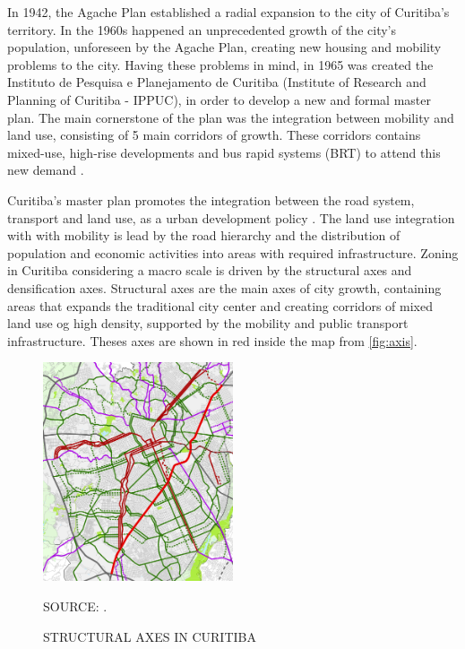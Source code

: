 In 1942, the Agache Plan established a radial expansion to the city of Curitiba's territory. In the 1960s happened an unprecedented growth of the city's population, unforeseen by the Agache Plan, creating new housing and mobility problems to the city. Having these problems in mind, in 1965 was created the Instituto de Pesquisa e Planejamento de Curitiba (Institute of Research and Planning of Curitiba - IPPUC), in order to develop a new and formal master plan. The main cornerstone of the plan was the integration between mobility and land use, consisting of 5 main corridors of growth. These corridors contains mixed-use, high-rise developments and bus rapid systems (BRT) to attend this new demand \cite{Rosario2016}. 

Curitiba's master plan promotes the integration between the road system, transport and land use, as a urban development policy \cite{Curitiba2015}. The land use integration with with mobility is lead by the road hierarchy and the distribution of population and economic activities into areas with required infrastructure. Zoning in Curitiba considering a macro scale is driven by the structural axes and densification axes. Structural axes are the main axes of city growth, containing areas that expands the traditional city center and creating corridors of mixed land use og high density, supported by the mobility and public transport infrastructure. Theses axes are shown in red inside the map from \autoref{fig:axis}. 

\begin{figure}[!htbp]
    \centering\footnotesize
    \captionsetup{font=footnotesize}
    \caption{STRUCTURAL AXES IN CURITIBA}
    \includegraphics[width=0.5\textwidth]{fig/axes.png}
    \label{fig:axis}
    \par SOURCE: \textcite{Curitiba2015}.
\end{figure}

